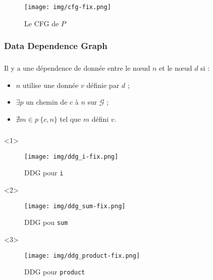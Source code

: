 \documentclass{beamer}
\begin{document}
      \begin{frame}
        \frametitle{\subsecname}
        \framesubtitle{\subsubsecname}
        
        \begin{figure}
          \centering
          \texttt{[image: img/cfg-fix.png]}
          \caption{Le CFG de $P$}
        \end{figure}  
      \end{frame}

      
      \subsubsection*{Data Dependence Graph}
      \begin{frame}
        \frametitle{\subsecname}
        \framesubtitle{\subsubsecname}

          Il y a  une dépendence de donnée entre le n{\oe}ud $n$ et le n{\oe}ud $d$ si :
          \begin{itemize}
                \item $n$ utilise une donnée $v$ définie par $d$ ;
                \item $\exists p$ un chemin de $c$ à $n$ sur $\mathcal{G}$ ;
                \item $\nexists m \in p \ \{c,n\}$ tel que $m$ défini $v$.
          \end{itemize}
      \end{frame}
        
      \begin{frame}
        \frametitle{\subsecname}
        \framesubtitle{\subsubsecname}

        \begin{onlyenv}<1>
          \begin{figure}
            \centering
            \texttt{[image: img/ddg\_i-fix.png]}
            \caption{DDG pour {\tt i}}
          \end{figure}
        \end{onlyenv}

        \begin{onlyenv}<2>
          \begin{figure}
            \centering
            \texttt{[image: img/ddg\_sum-fix.png]}
            \caption{DDG pou {\tt sum}}
          \end{figure}
        \end{onlyenv}

        \begin{onlyenv}<3>
          \begin{figure}
            \centering
            \texttt{[image: img/ddg\_product-fix.png]}
            \caption{DDG pour {\tt product}}
          \end{figure}
        \end{onlyenv}
      \end{frame}
      
\end{document}
